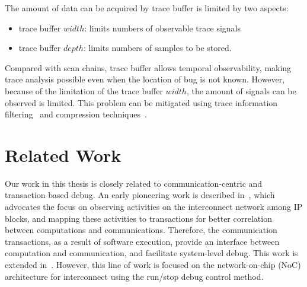 \documentclass[12pt,frontmatter,copyright,thesis]{usfmanus}
\begin{document}
The amount of data can be acquired by trace buffer is limited by two aspects:
\begin{itemize}
\item
trace buffer $width$: limits numbers of observable trace signals
\item
trace buffer $depth$: limits numbers of samples to be stored.
\end{itemize}
Compared with scan chains, trace buffer allows temporal observability,
making trace analysis possible even when the location of bug
is not known. However, because of the limitation of the trace buffer $width$,
the amount of signals can be observed is limited. This problem can be
mitigated using trace information filtering~\cite{abramovici2006reconfigurable} and compression techniques~\cite{anis2007interactive}.



\section{Related Work}

Our work in this thesis is closely related to communication-centric and
transaction based debug.  An early pioneering work is
described in~\cite{Goossens2007NOCS}, which advocates the
focus on observing activities on the interconnect network
among IP blocks, and mapping these activities to
transactions for better correlation between computations and
communications.  Therefore, the communication transactions,
as a result of software execution, provide an interface
between computation and communication, and facilitate
system-level debug.  This work is extended
in~\cite{Vermeulen2009VLSI-DAT,Goossens2009DATE}.  However,
this line of work is focused on the network-on-chip (NoC)
architecture for interconnect using the run/stop debug
control method.
\end{document}
